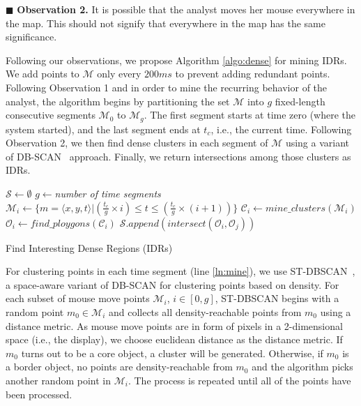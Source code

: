 \documentclass{vldb}
\begin{document}
\vspace{2pt}
\noindent $\blacksquare$ {\bf Observation 2.} It is possible that the analyst moves her mouse everywhere in the map. This should not signify that everywhere in the map has the same significance.

\vspace{2pt}
Following our observations, we propose Algorithm \ref{algo:dense} for mining IDRs. We add points to $\mathcal{M}$ only every $200ms$ to prevent adding redundant points.  Following Observation 1 and in order to mine the recurring behavior of the analyst, the algorithm begins by partitioning the set $\mathcal{M}$ into $g$ fixed-length consecutive segments $\mathcal{M}_0$ to $\mathcal{M}_g$. The first segment starts at time zero (where the system started), and the last segment ends at $t_c$, i.e., the current time. Following Observation 2, we then find dense clusters in each segment of $\mathcal{M}$ using a variant of DB-SCAN~\cite{Ester:1996} approach. Finally, we return intersections among those clusters as IDRs.

\begin{algorithm}[t]
\DontPrintSemicolon
{}
$\mathcal{S} \gets \emptyset$\;
$g \gets ${\em number of time segments}\;
{
       $\mathcal{M}_i \gets \{m = \langle x,y,t \rangle | (\frac{t_c}{g} \times i) \leq t \leq (\frac{t_c}{g} \times (i+1))\}$\;
       $\mathcal{C}_i \gets \mathit{mine\_clusters}(\mathcal{M}_i)$\label{ln:mine}\;
       $\mathcal{O}_i \gets \mathit{find\_ploygons}(\mathcal{C}_i)$\label{ln:poly}\;
}
{
       $\mathcal{S}.\mathit{append}(\mathit{intersect}(\mathcal{O}_i, \mathcal{O}_j))$
}
\; 
\caption{Find Interesting Dense Regions (IDRs)}
\label{algo:dense}
\end{algorithm}

\vspace{2pt}
For clustering points in each time segment (line \ref{ln:mine}), we use ST-DBSCAN~\cite{Birant:2007}, a space-aware variant of DB-SCAN for clustering points based on density. For each subset of mouse move points $\mathcal{M}_i$, $i \in [0,g]$, ST-DBSCAN begins with a random point $m_0 \in \mathcal{M}_i$ and collects all density-reachable points from $m_0$ using a distance metric. As mouse move points are in form of pixels in a 2-dimensional space (i.e., the display), we choose euclidean distance as the distance metric. If $m_0$ turns out to be a core object, a cluster will be generated. Otherwise, if $m_0$ is a border object, no points are density-reachable from $m_0$ and the algorithm picks another random point in $\mathcal{M}_i$. The process is repeated until all of the points have been processed.
\end{document}
